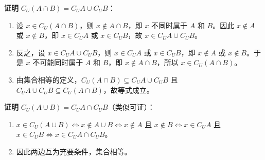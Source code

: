 \begin{proofbox}
\textbf{证明} $C_U(A \cap B) = C_U A \cup C_U B$：
\begin{enumerate}
    \item 设 $x \in C_U(A \cap B)$，则 $x \notin A \cap B$，即 $x$ 不同时属于 $A$ 和 $B$。因此 $x \notin A$ 或 $x \notin B$，即 $x \in C_U A$ 或 $x \in C_U B$，故 $x \in C_U A \cup C_U B$。
    \item 反之，设 $x \in C_U A \cup C_U B$，则 $x \in C_U A$ 或 $x \in C_U B$，即 $x \notin A$ 或 $x \notin B$。于是 $x$ 不可能同时属于 $A$ 和 $B$，即 $x \notin A \cap B$，所以 $x \in C_U(A \cap B)$。
    \item 由集合相等的定义，$C_U(A \cap B) \subseteq C_U A \cup C_U B$ 且 $C_U A \cup C_U B \subseteq C_U(A \cap B)$，故等式成立。
\end{enumerate}
\end{proofbox}

\begin{proofbox}
\textbf{证明} $C_U(A \cup B) = C_U A \cap C_U B$（类似可证）：
\begin{enumerate}
    \item $x \in C_U(A \cup B) \iff x \notin A \cup B \iff x \notin A$ 且 $x \notin B \iff x \in C_U A$ 且 $x \in C_U B \iff x \in C_U A \cap C_U B$。
    \item 因此两边互为充要条件，集合相等。
\end{enumerate}
\end{proofbox}